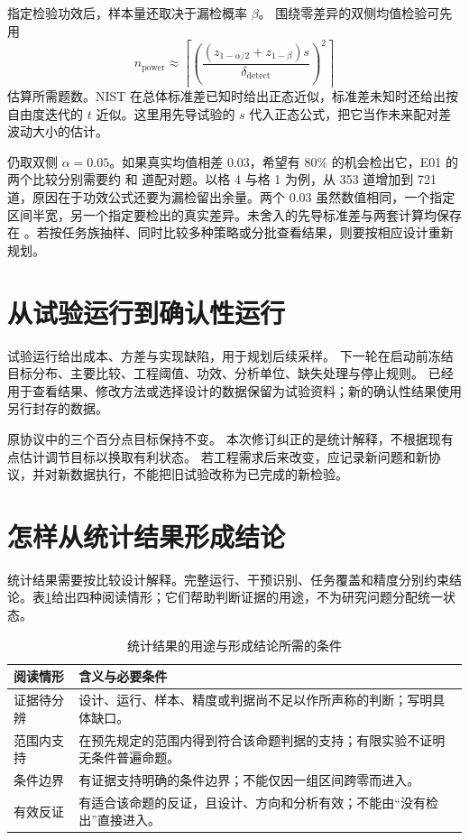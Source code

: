 指定检验功效后，样本量还取决于漏检概率 $\beta$。
围绕零差异的双侧均值检验可先用
\begin{equation}
 n_{\mathrm{power}}\approx
 \left\lceil\left(
 \frac{(z_{1-\alpha/2}+z_{1-\beta})s}{\delta_{\mathrm{detect}}}
 \right)^2\right\rceil
\end{equation}
估算所需题数。NIST 在总体标准差已知时给出正态近似，标准差未知时还给出按自由度迭代的 $t$ 近似\cite{nist-sample-size}。这里用先导试验的 $s$ 代入正态公式，把它当作未来配对差波动大小的估计。

仍取双侧 $\alpha=0.05$。如果真实均值相差 $0.03$，希望有 $80\%$ 的机会检出它，E01 的两个比较分别需要约  和  道配对题。以格 4 与格 1 为例，从 353 道增加到 721 道，原因在于功效公式还要为漏检留出余量。两个 $0.03$ 虽然数值相同，一个指定区间半宽，另一个指定要检出的真实差异。未舍入的先导标准差与两套计算均保存在 。若按任务族抽样、同时比较多种策略或分批查看结果，则要按相应设计重新规划。

\section{从试验运行到确认性运行}

试验运行给出成本、方差与实现缺陷，用于规划后续采样。
下一轮在启动前冻结目标分布、主要比较、工程阈值、功效、分析单位、缺失处理与停止规则。
已经用于查看结果、修改方法或选择设计的数据保留为试验资料；新的确认性结果使用另行封存的数据。

原协议中的三个百分点目标保持不变。
本次修订纠正的是统计解释，不根据现有点估计调节目标以换取有利状态。
若工程需求后来改变，应记录新问题和新协议，并对新数据执行，不能把旧试验改称为已完成的新检验。

\section{怎样从统计结果形成结论}

统计结果需要按比较设计解释。完整运行、干预识别、任务覆盖和精度分别约束结论。表\ref{tab:verdicts}给出四种阅读情形；它们帮助判断证据的用途，不为研究问题分配统一状态。

\begin{table}[htbp]
\centering
\caption{统计结果的用途与形成结论所需的条件}
\label{tab:verdicts}
\begin{tabular}{p{2.0cm}p{10.5cm}}
\toprule
阅读情形 & 含义与必要条件 \\
\midrule
证据待分辨 & 设计、运行、样本、精度或判据尚不足以作所声称的判断；写明具体缺口。 \\
范围内支持 & 在预先规定的范围内得到符合该命题判据的支持；有限实验不证明无条件普遍命题。 \\
条件边界 & 有证据支持明确的条件边界；不能仅因一组区间跨零而进入。 \\
有效反证 & 有适合该命题的反证，且设计、方向和分析有效；不能由“没有检出”直接进入。 \\
\bottomrule
\end{tabular}
\end{table}

